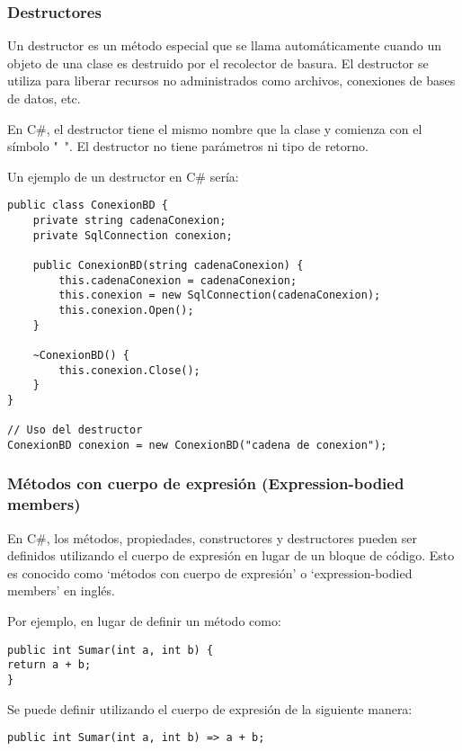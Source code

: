 \documentclass[executivepaper]{article}
\begin{document}
\subsubsection*{Destructores}

Un destructor es un método especial que se llama automáticamente cuando un objeto de una clase es destruido por el recolector de basura. El destructor se utiliza para liberar recursos no administrados como archivos, conexiones de bases de datos, etc.

En C\#, el destructor tiene el mismo nombre que la clase y comienza con el símbolo "~". El destructor no tiene parámetros ni tipo de retorno.

Un ejemplo de un destructor en C\# sería:

\begin{lstlisting}
public class ConexionBD {
    private string cadenaConexion;
    private SqlConnection conexion;

    public ConexionBD(string cadenaConexion) {
        this.cadenaConexion = cadenaConexion;
        this.conexion = new SqlConnection(cadenaConexion);
        this.conexion.Open();
    }

    ~ConexionBD() {
        this.conexion.Close();
    }
}

// Uso del destructor
ConexionBD conexion = new ConexionBD("cadena de conexion");
\end{lstlisting}

\subsubsection*{Métodos con cuerpo de expresión (Expression-bodied members)}

En C\#, los métodos, propiedades, constructores y destructores pueden ser definidos utilizando el cuerpo de expresión en lugar de un bloque de código. Esto es conocido como \enquote*{métodos con cuerpo de expresión} o \enquote*{expression-bodied members} en inglés.

Por ejemplo, en lugar de definir un método como:

\begin{lstlisting}
public int Sumar(int a, int b) {
return a + b;
}
\end{lstlisting}

Se puede definir utilizando el cuerpo de expresión de la siguiente manera:

\begin{lstlisting}
public int Sumar(int a, int b) => a + b;
\end{lstlisting}
\end{document}
